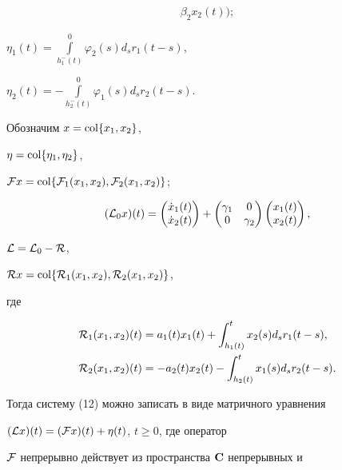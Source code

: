 \begin{exam}
\begin{align*}
\beta_2x_2(t)\bigg);


\end{align*}


$\eta_1(t)=\int\limits_{h_1^-(t)}^0\varphi_2(s)d_sr_1(t-s)$,


$\eta_2(t)=-\int\limits_{h_2^-(t)}^0\varphi_1(s)d_sr_2(t-s)$.


Обозначим $x=\operatorname{col}\{x_1,x_2\}$,


$\eta=\operatorname{col}\{\eta_1,\eta_2\}$,


${\cal F}x=\col\{{\cal F}_1(x_1,x_2),


{\cal F}_2(x_1,x_2)\}$;


$$


({\cal L}_0x)(t)=


\begin{pmatrix}\Dot x_1(t)\\ \Dot x_2(t)\end{pmatrix}+


\begin{pmatrix}\gamma_1 & 0 \\ 0 & \gamma_2\end{pmatrix}


\begin{pmatrix}x_1(t) \\ x_2(t)\end{pmatrix},


$$


${\cal L}={\cal L}_0-{\cal R}$,


${\cal R}x=\operatorname{col}\{{\cal R}_1(x_1,x_2),{\cal R}_2(x_1,x_2)\}$,


где


\begin{align*}


{\cal R}_1(x_1,x_2)(t)&=a_1(t)x_1(t)+


\int_{h_1(t)}^tx_2(s)d_sr_1(t-s),\\


%


{\cal R}_2(x_1,x_2)(t)&=-a_2(t)x_2(t)-


\int_{h_2(t)}^tx_1(s)d_sr_2(t-s).


\end{align*}





Тогда систему (12) можно записать в виде матричного уравнения


$({\cal L}x)(t)=({\cal F}x)(t)+\eta(t)$, $t\ge0$, где оператор


$\cal F$ непрерывно действует из пространства $\bold {C}$ непрерывных и



\end{exam}
